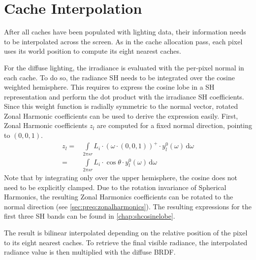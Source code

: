 \documentclass[thesis.tex]{subfiles}
\begin{document}
\section{Cache Interpolation}
After all caches have been populated with lighting data, their information needs to be interpolated across the screen.
As in the cache allocation pass, each pixel uses its world position to compute its eight nearest caches.
 
For the diffuse lighting, the irradiance is evaluated with the per-pixel normal in each cache.
To do so, the radiance SH needs to be integrated over the cosine weighted hemisphere.
This requires to express the cosine lobe in a SH representation and perform the dot product with the irradiance SH coefficients.
Since this weight function is radially symmetric to the normal vector, rotated Zonal Harmonic coefficients can be used to derive the expression easily.
First, Zonal Harmonic coefficients $z_l$ are computed for a fixed normal direction, pointing to $(0,0,1)$.
\begin{align}
z_l =&\int\limits_{2 \pi sr} L_i \cdot (\omega \cdot (0,0,1))^+ \cdot y^0_l(\omega) \,\mathrm{d}\omega\\
=&\int\limits_{2 \pi sr} L_i \cdot \cos\theta \cdot y^0_l(\omega) \,\mathrm{d}\omega
\end{align}
Note that by integrating only over the upper hemisphere, the cosine does not need to be explicitly clamped.
Due to the rotation invariance of Spherical Harmonics, the resulting Zonal Harmonics coefficients can be rotated to the normal direction (see \autoref{sec:preq:zonalharmonics}).
The resulting expressions for the first three SH bands can be found in \autoref{chap:shcosinelobe}.

The result is bilinear interpolated depending on the relative position of the pixel to its eight nearest caches.
To retrieve the final visible radiance, the interpolated radiance value is then multiplied with the diffuse BRDF.
\end{document}
